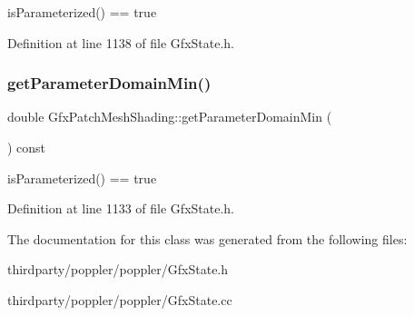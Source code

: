 is\+Parameterized() == true 

Definition at line 1138 of file Gfx\+State.\+h.

\mbox{\label{class_gfx_patch_mesh_shading_a9dfc69bcc0118dd37cb237634031b856}} 
\subsubsection{\texorpdfstring{get\+Parameter\+Domain\+Min()}{getParameterDomainMin()}}
{\footnotesize\ttfamily double Gfx\+Patch\+Mesh\+Shading\+::get\+Parameter\+Domain\+Min (\begin{DoxyParamCaption}{ }\end{DoxyParamCaption}) const\hspace{0.3cm}{\ttfamily [inline]}}

is\+Parameterized() == true 

Definition at line 1133 of file Gfx\+State.\+h.



The documentation for this class was generated from the following files\+:\begin{DoxyCompactItemize}
\item 
thirdparty/poppler/poppler/Gfx\+State.\+h\item 
thirdparty/poppler/poppler/Gfx\+State.\+cc\end{DoxyCompactItemize}
